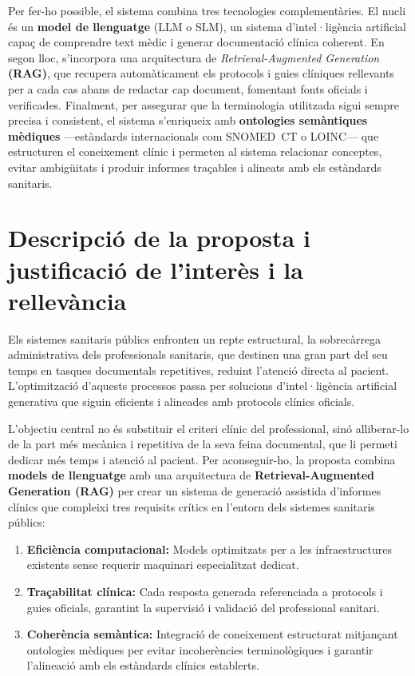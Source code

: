 \documentclass[11pt,a4paper]{article}
\begin{document}
Per fer-ho possible, el sistema combina tres tecnologies complementàries. El nucli és un \textbf{model de llenguatge} (LLM o SLM), un sistema d'intel·ligència artificial capaç de comprendre text mèdic i generar documentació clínica coherent. En segon lloc, s'incorpora una arquitectura de \textit{Retrieval-Augmented Generation} \textbf{(RAG)}, que recupera automàticament els protocols i guies clíniques rellevants per a cada cas abans de redactar cap document, fomentant fonts oficials i verificades. Finalment, per assegurar que la terminologia utilitzada sigui sempre precisa i consistent, el sistema s'enriqueix amb \textbf{ontologies semàntiques mèdiques} ---estàndards internacionals com SNOMED~CT o LOINC--- que estructuren el coneixement clínic i permeten al sistema relacionar conceptes, evitar ambigüitats i produir informes traçables i alineats amb els estàndards sanitaris.

\section*{Descripció de la proposta i justificació de l'interès i la rellevància}

Els sistemes sanitaris públics enfronten un repte estructural, la sobrecàrrega administrativa dels professionals sanitaris, que destinen una gran part del seu temps en tasques documentals repetitives, reduint l'atenció directa al pacient. L'optimització d'aquests processos passa per solucions d'intel·ligència artificial generativa que siguin eficients i alineades amb protocols clínics oficials.

L'objectiu central no és substituir el criteri clínic del professional, sinó alliberar-lo de la part més mecànica i repetitiva de la seva feina documental, que li permeti dedicar més temps i atenció al pacient. Per aconseguir-ho, la proposta combina \textbf{models de llenguatge} amb una arquitectura de \textbf{Retrieval-Augmented Generation (RAG)} per crear un sistema de generació assistida d'informes clínics que compleixi tres requisits crítics en l'entorn dels sistemes sanitaris públics:

\begin{enumerate}
    \item \textbf{Eficiència computacional:} Models optimitzats per a les infraestructures existents sense requerir maquinari especialitzat dedicat.
    
    \item \textbf{Traçabilitat clínica:} Cada resposta generada referenciada a protocols i guies oficials, garantint la supervisió i validació del professional sanitari.
    
    \item \textbf{Coherència semàntica:} Integració de coneixement estructurat mitjançant ontologies mèdiques per evitar incoherències terminològiques i garantir l'alineació amb els estàndards clínics establerts.
\end{enumerate}
\end{document}

